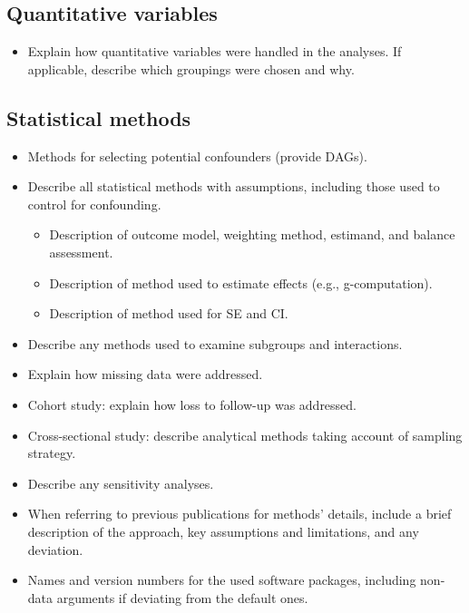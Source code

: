 \documentclass[
  letterpaper,
  DIV=11,
  numbers=noendperiod]{scrartcl}
\providecommand{\tightlist}{%
  \setlength{\itemsep}{0pt}\setlength{\parskip}{0pt}}\usepackage{longtable,booktabs,array}
\begin{document}
\hypertarget{sec-quant-vars}{%
\subsection{Quantitative variables}\label{sec-quant-vars}}

\begin{itemize}
\tightlist
\item
  Explain how quantitative variables were handled in the analyses. If
  applicable, describe which groupings were chosen and why.
\end{itemize}

\hypertarget{sec-stat-methods}{%
\subsection{Statistical methods}\label{sec-stat-methods}}

\begin{itemize}
\tightlist
\item
  Methods for selecting potential confounders (provide DAGs).
\item
  Describe all statistical methods with assumptions, including those
  used to control for confounding.

  \begin{itemize}
  \tightlist
  \item
    Description of outcome model, weighting method, estimand, and
    balance assessment.
  \item
    Description of method used to estimate effects (e.g.,
    g-computation).
  \item
    Description of method used for SE and CI.
  \end{itemize}
\item
  Describe any methods used to examine subgroups and interactions.
\item
  Explain how missing data were addressed.
\item
  Cohort study: explain how loss to follow-up was addressed.
\item
  Cross-sectional study: describe analytical methods taking account of
  sampling strategy.
\item
  Describe any sensitivity analyses.
\item
  When referring to previous publications for methods' details, include
  a brief description of the approach, key assumptions and limitations,
  and any deviation.
\item
  Names and version numbers for the used software packages, including
  non-data arguments if deviating from the default ones.
\end{itemize}
\end{document}

